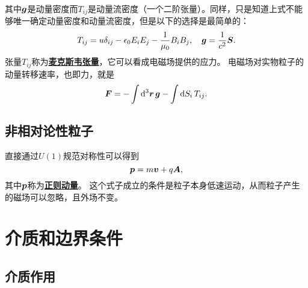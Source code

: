 \documentclass[UTF8, a4paper]{ctexart}
\newcommand*{\concept}[1]{\underline{\textbf{#1}}}
\begin{document}
其中$\vb*{g}$是动量密度而$T_{ij}$是动量流密度（一个二阶张量）。同样，只是知道上式不能够唯一确定动量密度和动量流密度，但是以下的选择是最简单的：
\begin{equation}
    T_{ij} = u \delta_{ij} - \epsilon_0 E_i E_j - \frac{1}{\mu_0} B_i B_j, \quad \vb*{g} = \frac{1}{c^2} \vb*{S}.
\end{equation}
张量$T_{ij}$称为\concept{麦克斯韦张量}，它可以看成电磁场提供的应力。
电磁场对实物粒子的动量转移速率，也即力，就是
\begin{equation}
    \vb*{F} = - \int \dd[3]{\vb*{r}} \vb*{g} - \int \dd{S_i} T_{ij}.
\end{equation}

\subsection{非相对论性粒子}

直接通过$U(1)$规范对称性可以得到
\begin{equation}
    \vb*{p} = m \vb*{v} + q \vb*{A},
\end{equation}
其中$\vb*{p}$称为\concept{正则动量}。
这个式子成立的条件是粒子本身低速运动，从而粒子产生的磁场可以忽略，且外场不变。

\section{介质和边界条件}

\subsection{介质作用}
\end{document}
